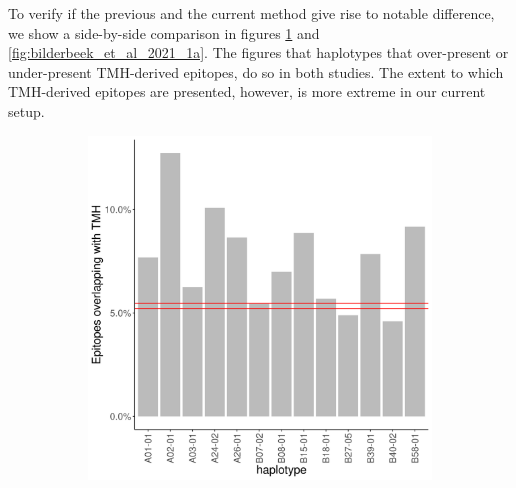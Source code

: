 
To verify if the previous and the current method give rise to
notable difference, we show a side-by-side comparison
in figures \ref{fig:bianch_et_al_2017_1a} and \ref{fig:bilderbeek_et_al_2021_1a}.
The figures that haplotypes that over-present or under-present TMH-derived epitopes,
do so in both studies. The extent to which TMH-derived epitopes are
presented, however, is more extreme in our current setup.

\begin{figure}
  \centering
  \begin{subfigure}[t]{0.45\textwidth}
    \centering
    \caption{}
    \includegraphics[width=\linewidth]{bianchi_et_al_2017_results/fig_1a.png}
    \label{fig:bianch_et_al_2017_1a}
  \end{subfigure}
  \hfill
  \begin{subfigure}[t]{0.45\textwidth}
    \centering
    \caption{}

\end{subfigure}
\end{figure}
